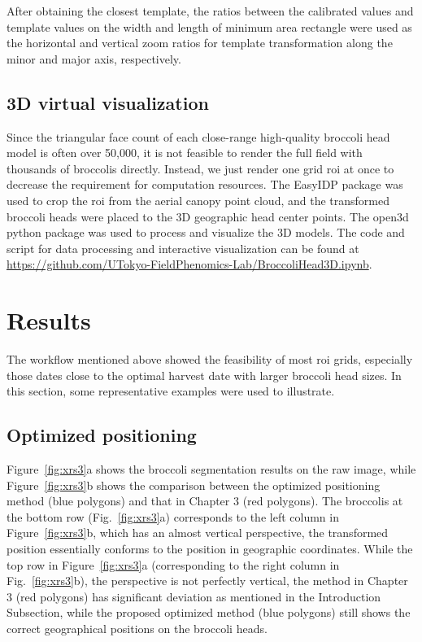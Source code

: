 After obtaining the closest template, the ratios between the calibrated values and template values on the width and length of minimum area rectangle were used as the horizontal and vertical zoom ratios for template transformation along the minor and major axis, respectively.

\subsection{3D virtual visualization}


Since the triangular face count of each close-range high-quality broccoli head model is often over 50,000, it is not feasible to render the full field with thousands of broccolis directly. Instead, we just render one grid \gls{roi} at once to decrease the requirement for computation resources. The EasyIDP package \citep{wang_easyidp_2021} was used to crop the \gls{roi} from the aerial canopy point cloud, and the transformed broccoli heads were placed to the 3D geographic head center points. The open3d python package \citep[\url{https://github.com/isl-org/Open3D}]{zhou_open3d_2018} was used to process and visualize the 3D models. The code and script for data processing and interactive visualization can be found at \url{https://github.com/UTokyo-FieldPhenomics-Lab/BroccoliHead3D.ipynb}.

\section{Results}

The workflow mentioned above showed the feasibility of most \gls{roi} grids, especially those dates close to the optimal harvest date with larger broccoli head sizes. In this section, some representative examples were used to illustrate.

\subsection{Optimized positioning}

Figure~\ref{fig:xrs3}a shows the broccoli segmentation results on the raw image, while Figure~\ref{fig:xrs3}b shows the comparison between the optimized positioning method (blue polygons) and that in Chapter 3 (red polygons). The broccolis at the bottom row (Fig.~\ref{fig:xrs3}a) corresponds to the left column in Figure~\ref{fig:xrs3}b, which has an almost vertical perspective, the transformed position essentially conforms to the position in geographic coordinates. While the top row in Figure~\ref{fig:xrs3}a (corresponding to the right column in Fig.~\ref{fig:xrs3}b), the perspective is not perfectly vertical, the method in Chapter 3 (red polygons) has significant deviation as mentioned in the Introduction Subsection, while the proposed optimized method (blue polygons) still shows the correct geographical positions on the broccoli heads.

